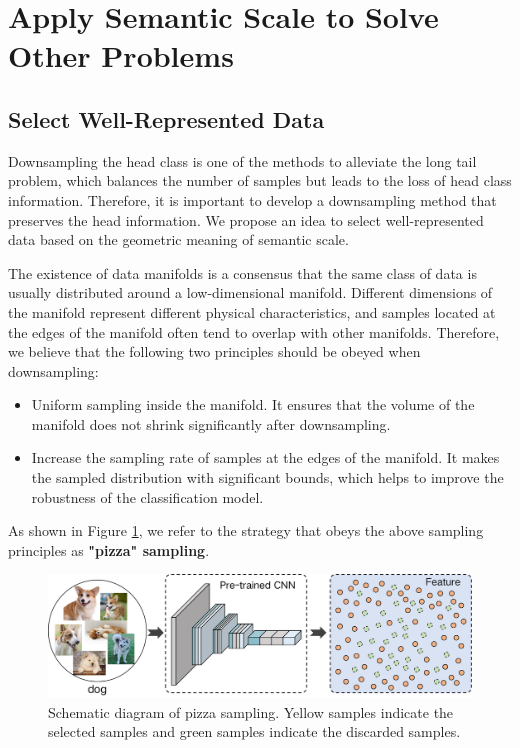 \documentclass[10pt]{article} %
\begin{document}
\section{Apply Semantic Scale to Solve Other Problems\label{I}}
\subsection{Select Well-Represented Data\label{I.1}}

Downsampling the head class is one of the methods to alleviate the long tail problem, which balances the number of samples but leads to the loss of head class information. Therefore, it is important to develop a downsampling method that preserves the head information. We propose an idea to select well-represented data based on the geometric meaning of semantic scale.

The existence of data manifolds is a consensus that the same class of data is usually distributed around a low-dimensional manifold. Different dimensions of the manifold represent different physical characteristics, and samples located at the edges of the manifold often tend to overlap with other manifolds. Therefore, we believe that the following two principles should be obeyed when downsampling:

\begin{itemize}
     \item Uniform sampling inside the manifold. It ensures that the volume of the manifold does not shrink significantly after downsampling.
     \item Increase the sampling rate of samples at the edges of the manifold. It makes the sampled distribution with significant bounds, which helps to improve the robustness of the classification model.
\end{itemize}

As shown in Figure \ref{fig24}, we refer to the strategy that obeys the above sampling principles as \textbf{"pizza" sampling}.

\begin{figure}[h] %
\begin{center}
\includegraphics[width=1\columnwidth]{fig34}
\vskip -0.05in
\caption{Schematic diagram of pizza sampling. Yellow samples indicate the selected samples and green samples indicate the discarded samples.}
\label{fig24}
\end{center}
\vskip -0.05in
\end{figure}
\end{document}
